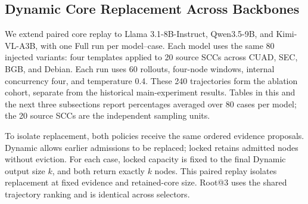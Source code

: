 \begin{ablationadded}
\subsection{Dynamic Core Replacement Across Backbones}
\label{app:new_core_ablation}

We extend paired core replay to Llama 3.1-8B-Instruct, Qwen3.5-9B, and Kimi-VL-A3B, with one Full run per model--case. Each model uses the same 80 injected variants: four templates applied to 20 source SCCs across CUAD, SEC, BGB, and Debian. Each run uses 60 rollouts, four-node windows, internal concurrency four, and temperature 0.4. These 240 trajectories form the ablation cohort, separate from the historical main-experiment results. Tables in this and the next three subsections report percentages averaged over 80 cases per model; the 20 source SCCs are the independent sampling units.

To isolate replacement, both policies receive the same ordered evidence proposals. Dynamic allows earlier admissions to be replaced; locked retains admitted nodes without eviction. For each case, locked capacity is fixed to the final Dynamic output size $k$, and both return exactly $k$ nodes. This paired replay isolates replacement at fixed evidence and retained-core size. Root@3 uses the shared trajectory ranking and is identical across selectors.


\end{ablationadded}
